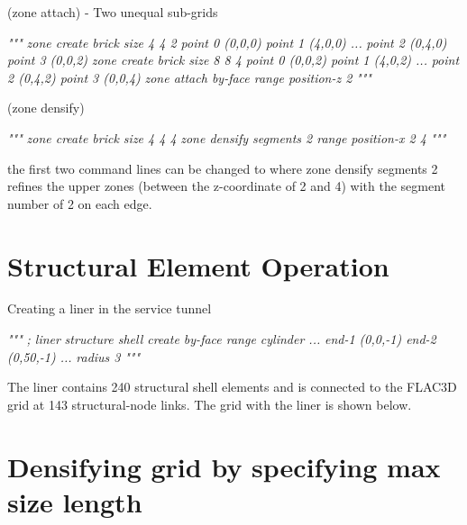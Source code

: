 \documentclass[a4paper, nobind]{templates/ociamthesis}
\newenvironment{Shaded}{\begin{snugshade}}{\end{snugshade}}
\newcommand{\CommentTok}[1]{\textcolor[rgb]{0.56,0.35,0.01}{\textit{#1}}}
\renewenvironment{Shaded}
{
  \vspace{10pt}%
  \begin{snugshade}%
}{%
  \end{snugshade}%
  \vspace{8pt}%
}
\begin{document}
(zone attach) - Two unequal sub-grids

\begin{Shaded}
\begin{Highlighting}[]
\CommentTok{"""}
\CommentTok{zone create brick size 4 4 2 point 0 (0,0,0) point 1 (4,0,0) ...}
\CommentTok{                             point 2 (0,4,0) point 3 (0,0,2)}
\CommentTok{zone create brick size 8 8 4 point 0 (0,0,2) point 1 (4,0,2) ...}
\CommentTok{                             point 2 (0,4,2) point 3 (0,0,4)}
\CommentTok{zone attach by{-}face range position{-}z 2}
\CommentTok{"""}
\end{Highlighting}
\end{Shaded}

(zone densify)

\begin{Shaded}
\begin{Highlighting}[]
\CommentTok{"""}
\CommentTok{zone create brick size 4 4 4}
\CommentTok{zone densify segments 2 range position{-}x 2 4}
\CommentTok{"""}
\end{Highlighting}
\end{Shaded}

the first two command lines can be changed to
where zone densify segments 2 refines the upper zones (between the z-coordinate of 2 and 4) with the segment number of 2 on each edge.

\hypertarget{structural-element-operation}{%
\section{Structural Element Operation}\label{structural-element-operation}}

Creating a liner in the service tunnel

\begin{Shaded}
\begin{Highlighting}[]
\CommentTok{"""}
\CommentTok{; liner}
\CommentTok{structure shell create by{-}face range cylinder ...}
\CommentTok{                                     end{-}1 (0,0,{-}1) end{-}2 (0,50,{-}1) ...}
\CommentTok{                                     radius 3}
\CommentTok{"""}
\end{Highlighting}
\end{Shaded}

The liner contains 240 structural shell elements and is connected to the FLAC3D grid at 143 structural-node links. The grid with the liner is shown below.

\hypertarget{densifying-grid-by-specifying-max-size-length}{%
\section{Densifying grid by specifying max size length}\label{densifying-grid-by-specifying-max-size-length}}
\end{document}
